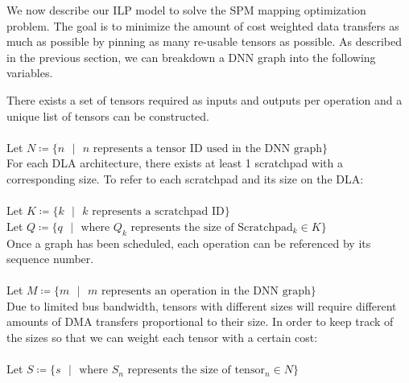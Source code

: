 We now describe our ILP model to solve the SPM mapping optimization problem. The goal is to minimize
the amount of cost weighted data transfers as much as possible by pinning as many re-usable tensors
as possible. As described in the previous section, we can breakdown a DNN graph into the following variables.


There exists a set of tensors required as inputs and outputs per operation and a unique list of tensors can be constructed.\\
\\
Let $N \coloneqq \{ n \text{ }  | \text{ } n   \text{ represents a tensor ID used in the DNN graph}\}$\\

For each DLA architecture, there exists at least 1 scratchpad with a corresponding size. To refer to each scratchpad and its size on the DLA:\\
\\
Let $K \coloneqq \{ k \text{ }  | \text{ } k   \text{ represents a scratchpad ID}\}$\\
Let $Q \coloneqq \{ q \text{ }| \text{ } \text{where } Q_k \text{ represents the size of Scratchpad$_k \in K$}\}$\\

Once a graph has been scheduled, each operation can be referenced by its sequence number.\\
\\
Let $M \coloneqq \{ m \text{ }  | \text{ } m   \text{ represents an operation in the DNN graph}\}$\\

Due to limited bus bandwidth, tensors with different sizes will require
different amounts of DMA transfers proportional to their size. In order to keep
track of the sizes so that we can weight each tensor with a certain cost:\\
\\
Let $S \coloneqq \{ s \text{ }| \text{ } \text{where } S_n \text{ represents the size of tensor$_n \in N$}\}$\\


